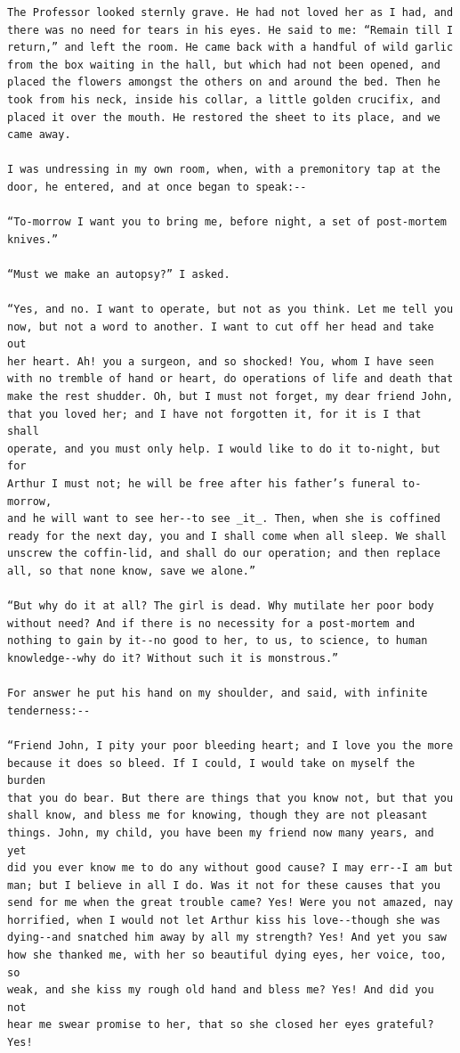 \documentclass{article}
\begin{document}
\begin{verbatim}
The Professor looked sternly grave. He had not loved her as I had, and
there was no need for tears in his eyes. He said to me: “Remain till I
return,” and left the room. He came back with a handful of wild garlic
from the box waiting in the hall, but which had not been opened, and
placed the flowers amongst the others on and around the bed. Then he
took from his neck, inside his collar, a little golden crucifix, and
placed it over the mouth. He restored the sheet to its place, and we
came away.

I was undressing in my own room, when, with a premonitory tap at the
door, he entered, and at once began to speak:--

“To-morrow I want you to bring me, before night, a set of post-mortem
knives.”

“Must we make an autopsy?” I asked.

“Yes, and no. I want to operate, but not as you think. Let me tell you
now, but not a word to another. I want to cut off her head and take out
her heart. Ah! you a surgeon, and so shocked! You, whom I have seen
with no tremble of hand or heart, do operations of life and death that
make the rest shudder. Oh, but I must not forget, my dear friend John,
that you loved her; and I have not forgotten it, for it is I that shall
operate, and you must only help. I would like to do it to-night, but for
Arthur I must not; he will be free after his father’s funeral to-morrow,
and he will want to see her--to see _it_. Then, when she is coffined
ready for the next day, you and I shall come when all sleep. We shall
unscrew the coffin-lid, and shall do our operation; and then replace
all, so that none know, save we alone.”

“But why do it at all? The girl is dead. Why mutilate her poor body
without need? And if there is no necessity for a post-mortem and
nothing to gain by it--no good to her, to us, to science, to human
knowledge--why do it? Without such it is monstrous.”

For answer he put his hand on my shoulder, and said, with infinite
tenderness:--

“Friend John, I pity your poor bleeding heart; and I love you the more
because it does so bleed. If I could, I would take on myself the burden
that you do bear. But there are things that you know not, but that you
shall know, and bless me for knowing, though they are not pleasant
things. John, my child, you have been my friend now many years, and yet
did you ever know me to do any without good cause? I may err--I am but
man; but I believe in all I do. Was it not for these causes that you
send for me when the great trouble came? Yes! Were you not amazed, nay
horrified, when I would not let Arthur kiss his love--though she was
dying--and snatched him away by all my strength? Yes! And yet you saw
how she thanked me, with her so beautiful dying eyes, her voice, too, so
weak, and she kiss my rough old hand and bless me? Yes! And did you not
hear me swear promise to her, that so she closed her eyes grateful? Yes!


\end{verbatim}
\end{document}
